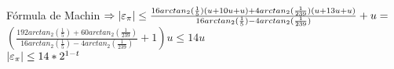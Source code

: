 \begin{subsection}{Fórmula de Machin}
	$\Rightarrow \left|\varepsilon _{\pi}\right| \leq \frac{16arctan_2(\frac{1}{5})(u + 10u + u) + 4arctan_2(\frac{1}{239})(u + 13u + u)}{16arctan_2(\frac{1}{5})-4arctan_2(\frac{1}{239})} + u =$\\
	
	$(\frac{192arctan_2(\frac{1}{5}) + 60arctan_2(\frac{1}{239})}{16arctan_2(\frac{1}{5})-4arctan_2(\frac{1}{239})} + 1) u \leq 14u$\\
	
	$\left|\varepsilon _{\pi}\right| \leq 14*2^{1-t}$
	
	
\end{subsection}

